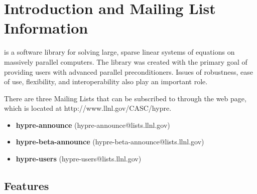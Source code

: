 

\chapter{Introduction and Mailing List Information}
\label{Introduction and Mailing List Information}

\hypre{} is a software library for solving large, sparse linear
systems of equations on massively parallel computers.  The library was
created with the primary goal of providing users with advanced
parallel preconditioners.  Issues of robustness, ease of use,
flexibility, and interoperability also play an important role.


There are three \hypre{} Mailing Lists that can be subscribed to through the \hypre{}
web page, which is located at http://www.llnl.gov/CASC/hypre.  

\begin{itemize}
\item
{\bf hypre-announce} (hypre-announce@lists.llnl.gov)
\linebreak{ }

\item
{\bf hypre-beta-announce} (hypre-beta-announce@lists.llnl.gov)
\linebreak{ }

\item
{\bf hypre-users} (hypre-users@lists.llnl.gov)

\end{itemize}

\section{Features}
\label{Features}

